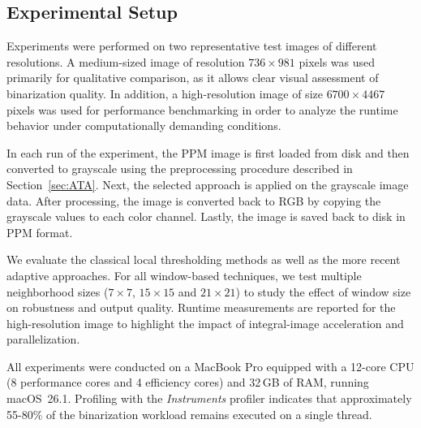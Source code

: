 \subsection{Experimental Setup}\label{subsec:exp_setup}

Experiments were performed on two representative test images of different resolutions.
A medium-sized image of resolution $736 \times 981$ pixels was used primarily for qualitative comparison, as it allows clear visual assessment of binarization quality.
In addition, a high-resolution image of size $6700 \times 4467$ pixels was used for performance benchmarking in order to analyze the runtime behavior under computationally demanding conditions.

In each run of the experiment, the PPM image is first loaded from disk and then converted to grayscale using the preprocessing procedure described in Section~\ref{sec:ATA}. Next, the selected approach is applied on the grayscale image data. After processing, the image is converted back to RGB by copying the grayscale values to each color channel. Lastly, the image is saved back to disk in PPM format.

We evaluate the classical local thresholding methods as well as the more recent adaptive approaches.
For all window-based techniques, we test multiple neighborhood sizes ($7\times 7$, $15\times 15$ and $21\times 21$) to study the effect of window size on robustness and output quality.
Runtime measurements are reported for the high-resolution image to highlight the impact of integral-image acceleration and parallelization.

All experiments were conducted on a MacBook Pro equipped with a 12-core CPU (8 performance cores and 4 efficiency cores) and 32\,GB of RAM, running macOS~26.1.
Profiling with the \textit{Instruments} profiler indicates that approximately 55-80\% of the binarization workload remains executed on a single thread.
